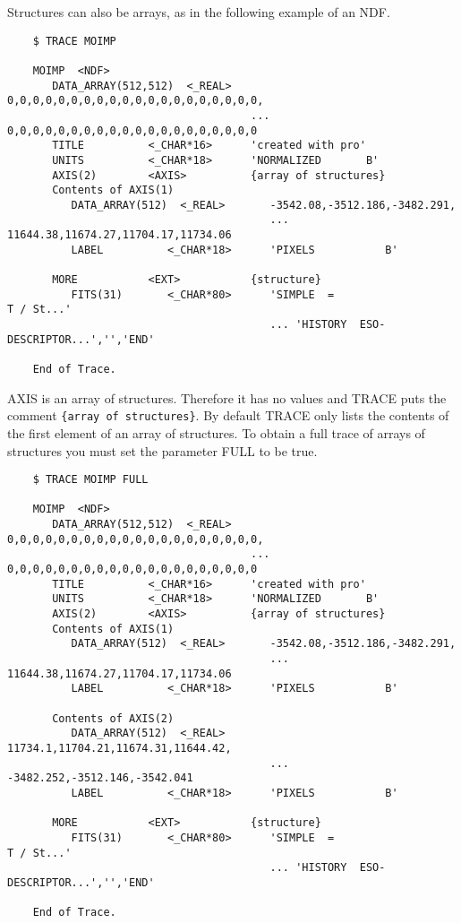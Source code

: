 Structures can also be arrays, as in the following example of an NDF.
\small
\begin{verbatim}
    $ TRACE MOIMP

    MOIMP  <NDF>
       DATA_ARRAY(512,512)  <_REAL>   0,0,0,0,0,0,0,0,0,0,0,0,0,0,0,0,0,0,0,0,
                                      ... 0,0,0,0,0,0,0,0,0,0,0,0,0,0,0,0,0,0,0,0
       TITLE          <_CHAR*16>      'created with pro'
       UNITS          <_CHAR*18>      'NORMALIZED       B'
       AXIS(2)        <AXIS>          {array of structures}
       Contents of AXIS(1)
          DATA_ARRAY(512)  <_REAL>       -3542.08,-3512.186,-3482.291,
                                         ... 11644.38,11674.27,11704.17,11734.06
          LABEL          <_CHAR*18>      'PIXELS           B'

       MORE           <EXT>           {structure}
          FITS(31)       <_CHAR*80>      'SIMPLE  =                    T / St...'
                                         ... 'HISTORY  ESO-DESCRIPTOR...','','END'
                                                                             
    End of Trace.
\end{verbatim}
\normalsize
AXIS is an array of structures.  Therefore it has no values and {\small 
TRACE} puts the comment {\tt \{array of structures\}}.  By default
{\small TRACE} only lists the contents of the first element of an array
of structures.  To obtain a full trace of arrays of structures you must
set the parameter FULL to be true.
\small
\begin{verbatim}
    $ TRACE MOIMP FULL

    MOIMP  <NDF>
       DATA_ARRAY(512,512)  <_REAL>   0,0,0,0,0,0,0,0,0,0,0,0,0,0,0,0,0,0,0,0,
                                      ... 0,0,0,0,0,0,0,0,0,0,0,0,0,0,0,0,0,0,0,0
       TITLE          <_CHAR*16>      'created with pro'
       UNITS          <_CHAR*18>      'NORMALIZED       B'
       AXIS(2)        <AXIS>          {array of structures}
       Contents of AXIS(1)
          DATA_ARRAY(512)  <_REAL>       -3542.08,-3512.186,-3482.291,
                                         ... 11644.38,11674.27,11704.17,11734.06
          LABEL          <_CHAR*18>      'PIXELS           B'

       Contents of AXIS(2)
          DATA_ARRAY(512)  <_REAL>       11734.1,11704.21,11674.31,11644.42,
                                         ... -3482.252,-3512.146,-3542.041
          LABEL          <_CHAR*18>      'PIXELS           B'

       MORE           <EXT>           {structure}
          FITS(31)       <_CHAR*80>      'SIMPLE  =                    T / St...'
                                         ... 'HISTORY  ESO-DESCRIPTOR...','','END'

    End of Trace.
\end{verbatim}
\normalsize

